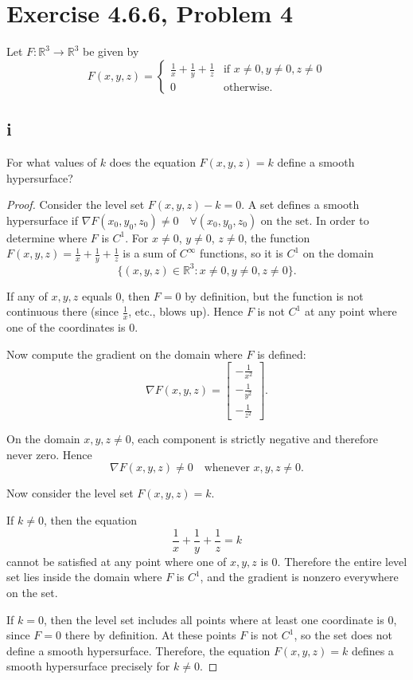 \documentclass{article}
\begin{document}
\clearpage

\section*{Exercise 4.6.6, Problem 4}
Let $F : \mathbb{R}^3 \rightarrow \mathbb{R}^3$ be given by
$$F (x, y, z) =
\begin{cases}
    \frac{1}{x}+\frac{1}{y}+\frac{1}{z} & \text{if } x \neq 0, y \neq 0, z \neq 0 \\
    0 & \text{otherwise.}
\end{cases}
$$
\subsection*{i}
For what values of $k$ does the equation $F (x, y, z) = k$ define a smooth hypersurface?
\begin{proof}
    Consider the level set $F(x,y,z)-k=0.$ A set defines a smooth hypersurface if $\nabla F(x_0,y_0,z_0) \neq 0 \quad \forall (x_0,y_0,z_0) \text{ on the set.}$
    In order to determine where $F$ is $C^1$. For $x\neq 0$, $y\neq 0$, $z\neq 0$, the function $F(x,y,z)=\frac{1}{x}+\frac{1}{y}+\frac{1}{z}$ is a sum of $C^\infty$ functions, so it is $C^1$ on the domain
    $$\{(x,y,z)\in \mathbb{R}^3 : x\neq 0, y\neq 0, z\neq 0\}.$$
    
    If any of $x,y,z$ equals $0$, then $F=0$ by definition, but the function is not continuous there (since $\frac{1}{x}$, etc., blows up). Hence $F$ is not $C^1$ at any point where one of the coordinates is $0$.

    Now compute the gradient on the domain where $F$ is defined:
    $$\nabla F(x,y,z)=
    \begin{bmatrix}
        -\frac{1}{x^2} \\
        -\frac{1}{y^2} \\
        -\frac{1}{z^2}
    \end{bmatrix}.
    $$

    On the domain $x,y,z\neq 0$, each component is strictly negative and therefore never zero. Hence
    $$\nabla F(x,y,z)\neq 0 \quad \text{whenever } x,y,z\neq 0.$$

    Now consider the level set $F(x,y,z)=k$.

    If $k\neq 0$, then the equation
    $$\frac{1}{x}+\frac{1}{y}+\frac{1}{z}=k$$
    cannot be satisfied at any point where one of $x,y,z$ is $0$. Therefore the entire level set lies inside the domain where $F$ is $C^1$, and the gradient is nonzero everywhere on the set.

    If $k=0$, then the level set includes all points where at least one coordinate is $0$, since $F=0$ there by definition. At these points $F$ is not $C^1$, so the set does not define a smooth hypersurface. Therefore, the equation $F(x,y,z)=k$ defines a smooth hypersurface precisely for $k\neq 0.$
\end{proof}
\end{document}
